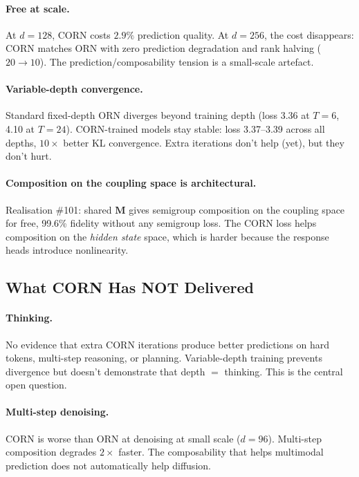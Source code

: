 \documentclass[11pt, a4paper]{article}
\newcommand{\M}{\mathbf{M}}
\theoremstyle{plain}
\theoremstyle{definition}
\theoremstyle{remark}
\begin{document}
\paragraph{Free at scale.}
At $d{=}128$, CORN costs $2.9\%$ prediction quality.
At $d{=}256$, the cost disappears: CORN matches ORN with zero prediction degradation and rank halving ($20 \to 10$).
The prediction/composability tension is a small-scale artefact.

\paragraph{Variable-depth convergence.}
Standard fixed-depth ORN diverges beyond training depth (loss 3.36 at $T{=}6$, 4.10 at $T{=}24$).
CORN-trained models stay stable: loss 3.37--3.39 across all depths, $10\times$ better KL convergence.
Extra iterations don't help (yet), but they don't hurt.

\paragraph{Composition on the coupling space is architectural.}
Realisation \#101: shared $\M$ gives semigroup composition on the coupling space for free, 99.6\% fidelity without any semigroup loss.
The CORN loss helps composition on the \emph{hidden state} space, which is harder because the response heads introduce nonlinearity.

\subsection{What CORN Has NOT Delivered}

\paragraph{Thinking.}
No evidence that extra CORN iterations produce better predictions on hard tokens, multi-step reasoning, or planning.
Variable-depth training prevents divergence but doesn't demonstrate that depth $=$ thinking.
This is the central open question.

\paragraph{Multi-step denoising.}
CORN is worse than ORN at denoising at small scale ($d{=}96$).
Multi-step composition degrades $2\times$ faster.
The composability that helps multimodal prediction does not automatically help diffusion.
\end{document}
